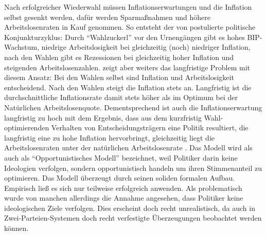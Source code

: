Nach erfolgreicher Wiederwahl müssen Inflationserwartungen und die Inflation selbst gesenkt werden, dafür werden Sparmaßnahmen und höhere Arbeitslosenraten in Kauf genommen. So entsteht der von \textcite{Nordhaus1975} postulierte politische Konjunkturzyklus: Durch "`Wahlzuckerl"' vor den Urnengängen gibt es hohes BIP-Wachstum, niedrige Arbeitslosigkeit bei gleichzeitig (noch) niedriger Inflation, nach den Wahlen gibt es Rezessionen bei gleichzeitig hoher Inflation und steigenden Arbeitslosenzahlen.
\textcite{Nordhaus1975} zeigt aber weiters das langfristige Problem mit diesem Ansatz: Bei den Wahlen selbst sind Inflation und Arbeitslosigkeit entscheidend. Nach den Wahlen steigt die Inflation stets an. Langfristig ist die durchschnittliche Inflationsrate damit stets höher als im Optimum bei der Natürlichen Arbeitslosenquote. Dementsprechend ist auch die Inflationserwartung langfristig zu hoch mit dem Ergebnis, dass aus dem kurzfristig Wahl-optimierenden Verhalten von Entscheidungsträgern eine Politik resultiert, die langfristig eine zu hohe Inflation hervorbringt, gleichzeitig liegt die Arbeitslosenraten unter der natürlichen Arbeitslosenrate \parencite{Nordhaus1975}. 
Das Modell wird als auch als "`Opportunistisches Modell"' bezeichnet, weil Politiker darin keine Ideologien verfolgen, sondern opportunistisch handeln um ihren Stimmenanteil zu optimieren. Das Modell überzeugt durch seinen soliden formalen Aufbau. Empirisch ließ es sich nur teilweise erfolgreich anwenden. Als problematisch wurde von manchen allerdings die Annahme angesehen, dass Politiker keine ideologischen Ziele verfolgen. Dies erscheint doch recht unrealistisch, da auch in Zwei-Parteien-Systemen doch recht verfestigte Überzeugungen beobachtet werden können.

